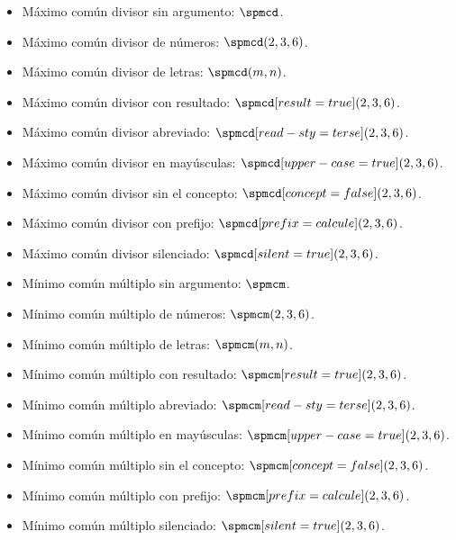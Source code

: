 \documentclass{article}
\begin{document}
\begin{itemize}
  \item Máximo común divisor sin argumento: $\spmcd$.
  \item Máximo común divisor de números: $\spmcd(2, 3, 6)$.
  \item Máximo común divisor de letras: $\spmcd(m, n)$.
  \item Máximo común divisor con resultado: $\spmcd[result=true](2, 3, 6)$.
  \item Máximo común divisor abreviado: $\spmcd[read-sty=terse](2, 3, 6)$.
  \item Máximo común divisor en mayúsculas: $\spmcd[upper-case=true](2, 3, 6)$.
  \item Máximo común divisor sin el concepto: $\spmcd[concept=false](2, 3, 6)$.
  \item Máximo común divisor con prefijo: $\spmcd[prefix={calcule}](2, 3, 6)$.
  \item Máximo común divisor silenciado: $\spmcd[silent=true](2, 3, 6)$.
  \item Mínimo común múltiplo sin argumento: $\spmcm$.
  \item Mínimo común múltiplo de números: $\spmcm(2, 3, 6)$.
  \item Mínimo común múltiplo de letras: $\spmcm(m, n)$.
  \item Mínimo común múltiplo con resultado: $\spmcm[result=true](2, 3, 6)$.
  \item Mínimo común múltiplo abreviado: $\spmcm[read-sty=terse](2, 3, 6)$.
  \item Mínimo común múltiplo en mayúsculas: $\spmcm[upper-case=true](2, 3, 6)$.
  \item Mínimo común múltiplo sin el concepto: $\spmcm[concept=false](2, 3, 6)$.
  \item Mínimo común múltiplo con prefijo: $\spmcm[prefix={calcule}](2, 3, 6)$.
  \item Mínimo común múltiplo silenciado: $\spmcm[silent=true](2, 3, 6)$.
\end{itemize}
\end{document}
